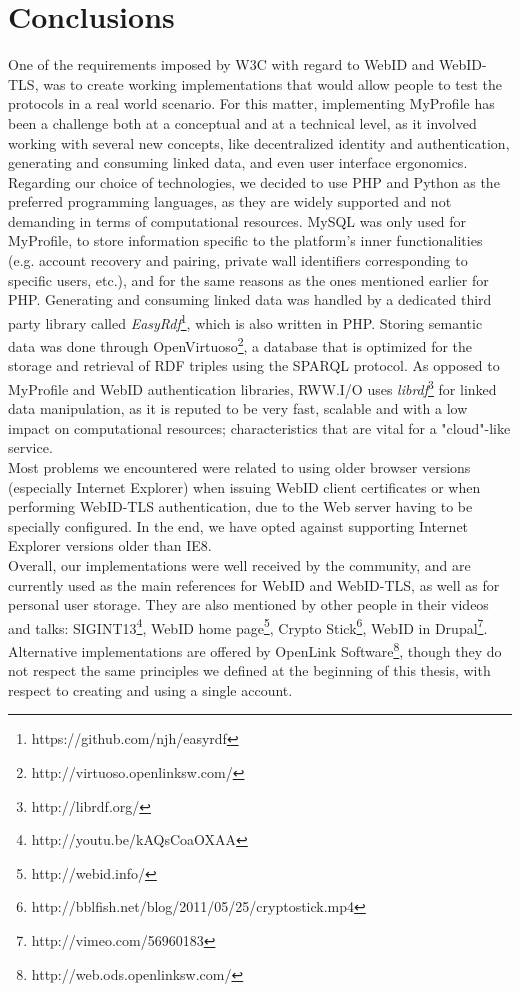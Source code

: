 \section{Conclusions}
One of the requirements imposed by W3C with regard to WebID and WebID-TLS, was to create working implementations that would allow people to test the protocols in a real world scenario. For this matter, implementing MyProfile has been a challenge both at a conceptual and at a technical level, as it involved working with several new concepts, like decentralized identity and authentication, generating and consuming linked data, and even user interface ergonomics.\\

Regarding our choice of technologies, we decided to use PHP and Python as the preferred programming languages, as they are widely supported and not demanding in terms of computational resources. MySQL was only used for MyProfile, to store information specific to the platform's inner functionalities (e.g. account recovery and pairing, private wall identifiers corresponding to specific users, etc.), and for the same reasons as the ones mentioned earlier for PHP. Generating and consuming linked data was handled by a dedicated third party library called \textit{EasyRdf}\footnote{https://github.com/njh/easyrdf}, which is also written in PHP. Storing semantic data was done through OpenVirtuoso\footnote{http://virtuoso.openlinksw.com/}, a database that is optimized for the storage and retrieval of RDF triples using the SPARQL protocol. As opposed to MyProfile and WebID authentication libraries, RWW.I/O uses \textit{librdf}\footnote{http://librdf.org/} for linked data manipulation, as it is reputed to be very fast, scalable and with a low impact on computational resources; characteristics that are vital for a "cloud"-like service.\\

Most problems we encountered were related to using older browser versions (especially Internet Explorer) when issuing WebID client certificates or when performing WebID-TLS authentication, due to the Web server having to be specially configured. In the end, we have opted against supporting Internet Explorer versions older than IE8.\\

Overall, our implementations were well received by the community, and are currently used as the main references for WebID and WebID-TLS, as well as for personal user storage. They are also mentioned by other people in their videos and talks: SIGINT13\footnote{http://youtu.be/kAQsCoaOXAA}, WebID home page\footnote{http://webid.info/}, Crypto Stick\footnote{http://bblfish.net/blog/2011/05/25/cryptostick.mp4}, WebID in Drupal\footnote{http://vimeo.com/56960183}.\\

Alternative implementations are offered by OpenLink Software\footnote{http://web.ods.openlinksw.com/}, though they do not respect the same principles we defined at the beginning of this thesis, with respect to creating and using a single account.
